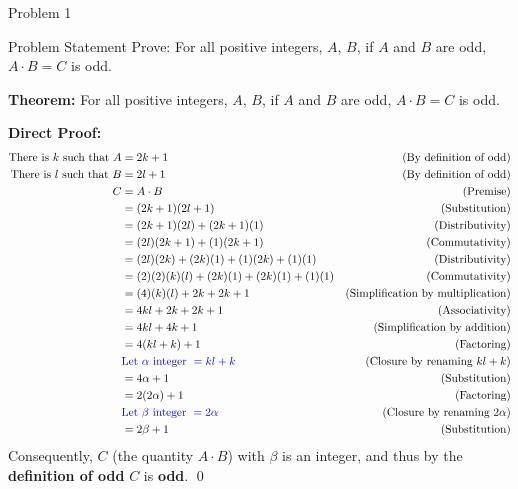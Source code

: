\begin{problem}{Problem 1}
    \begin{statement}{Problem Statement}
        Prove: For all positive integers, $A$, $B$, if $A$ and $B$ are odd, $A \cdot B = C$ is odd.
    \end{statement}

    \begin{Highlight}[Solution]
        \textbf{Theorem:} For all positive integers, $A$, $B$, if $A$ and $B$ are odd, $A \cdot B = C$ is odd. \vspace*{1em}

        \textbf{Direct Proof:} \newline
        \begin{align*}
            \text{There is $k$ such that } A & = 2k + 1 & \text{(By definition of odd)} \\
            \text{There is $l$ such that } B & = 2l + 1 & \text{(By definition of odd)} \\
            C & = A \cdot B & \text{(Premise)} \\
            & = (2k + 1)(2l + 1) & \text{(Substitution)} \\
            & = (2k + 1)(2l) + (2k + 1)(1) & \text{(Distributivity)} \\
            & = (2l)(2k + 1) + (1)(2k + 1) & \text{(Commutativity)} \\
            & = (2l)(2k) + (2k)(1) + (1)(2k) + (1)(1) & \text{(Distributivity)} \\
            & = (2)(2)(k)(l) + (2k)(1) + (2k)(1) + (1)(1) & \text{(Commutativity)} \\
            & = (4)(k)(l) + 2k + 2k + 1 & \text{(Simplification by multiplication)} \\
            & = 4kl + 2k + 2k + 1 & \text{(Associativity)} \\
            & = 4kl + 4k + 1 & \text{(Simplification by addition)} \\
            & = 4(kl + k) + 1 & \text{(Factoring)} \\
            & \textcolor{blue}{\text{Let } \alpha \text{ integer } = kl + k} & \text{(Closure by renaming $kl + k$)} \\
            & = 4\alpha + 1 & \text{(Substitution)} \\
            & = 2(2\alpha) + 1 & \text{(Factoring)} \\
            & \textcolor{blue}{\text{Let } \beta \text{ integer } = 2\alpha} & \text{(Closure by renaming $2\alpha$)} \\
            & = 2\beta + 1 & \text{(Substitution)} \\
        \end{align*}
        Consequently, $C$ (the quantity $A\cdot B$) with $\beta$ is an integer, and thus by the \textbf{definition of odd} $C$ is \textbf{odd}. \qed
    \end{Highlight}
\end{problem}

